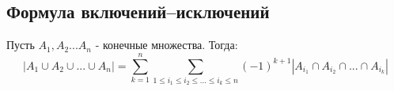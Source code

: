 \subsection{Формула включений–исключений}{
	Пусть $A_1, A_2 ... A_n$ - конечные множества. Тогда:
	$$|A_1 \cup A_2 \cup ... \cup A_n| = \sum_{k=1}^{n}\sum_{1 \leqslant i_1 \leqslant i_2 \leqslant ... \leqslant i_k \leqslant n}(-1)^{k+1}|A_{i_1} \cap A_{i_2} \cap ... \cap A_{i_k}|$$
}